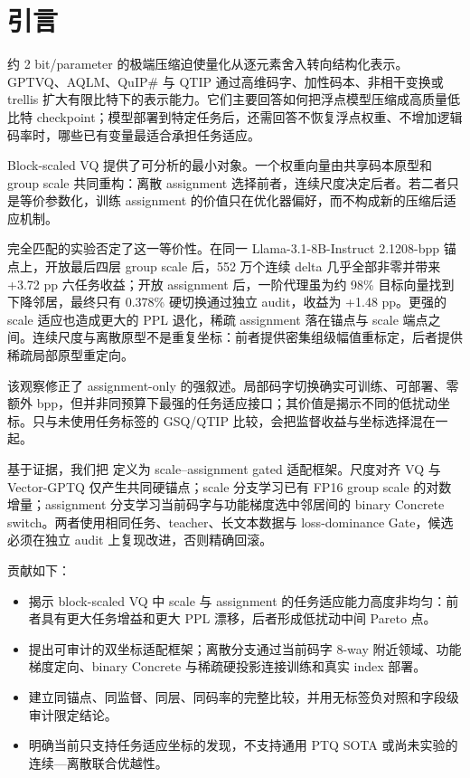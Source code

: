 \section{引言}

约 2 bit/parameter 的极端压缩迫使量化从逐元素舍入转向结构化表示。GPTVQ、AQLM、QuIP\# 与 QTIP 通过高维码字、加性码本、非相干变换或 trellis 扩大有限比特下的表示能力\cite{gptvq,aqlm,quipsharp,qtip}。它们主要回答如何把浮点模型压缩成高质量低比特 checkpoint；模型部署到特定任务后，还需回答不恢复浮点权重、不增加逻辑码率时，哪些已有变量最适合承担任务适应。

Block-scaled VQ 提供了可分析的最小对象。一个权重向量由共享码本原型和 group scale 共同重构：离散 assignment 选择前者，连续尺度决定后者。若二者只是等价参数化，训练 assignment 的价值只在优化器偏好，而不构成新的压缩后适应机制。

完全匹配的实验否定了这一等价性。在同一 Llama-3.1-8B-Instruct 2.1208-bpp 锚点上，开放最后四层 group scale 后，552 万个连续 delta 几乎全部非零并带来 +3.72 pp 六任务收益；开放 assignment 后，一阶代理虽为约 98\% 目标向量找到下降邻居，最终只有 0.378\% 硬切换通过独立 audit，收益为 +1.48 pp。更强的 scale 适应也造成更大的 PPL 退化，稀疏 assignment 落在锚点与 scale 端点之间。连续尺度与离散原型不是重复坐标：前者提供密集组级幅值重标定，后者提供稀疏局部原型重定向。

该观察修正了 assignment-only 的强叙述。局部码字切换确实可训练、可部署、零额外 bpp，但并非同预算下最强的任务适应接口；其价值是揭示不同的低扰动坐标。只与未使用任务标签的 GSQ/QTIP 比较，会把监督收益与坐标选择混在一起。

基于证据，我们把 \method 定义为 scale--assignment gated 适配框架。尺度对齐 VQ 与 Vector-GPTQ 仅产生共同硬锚点；scale 分支学习已有 FP16 group scale 的对数增量；assignment 分支学习当前码字与功能梯度选中邻居间的 binary Concrete switch。两者使用相同任务、teacher、长文本数据与 loss-dominance Gate，候选必须在独立 audit 上复现改进，否则精确回滚。

贡献如下：
\begin{itemize}
\item 揭示 block-scaled VQ 中 scale 与 assignment 的任务适应能力高度非均匀：前者具有更大任务增益和更大 PPL 漂移，后者形成低扰动中间 Pareto 点。
\item 提出可审计的双坐标适配框架；离散分支通过当前码字 8-way 附近领域、功能梯度定向、binary Concrete 与稀疏硬投影连接训练和真实 index 部署。
\item 建立同锚点、同监督、同层、同码率的完整比较，并用无标签负对照和字段级审计限定结论。
\item 明确当前只支持任务适应坐标的发现，不支持通用 PTQ SOTA 或尚未实验的连续—离散联合优越性。
\end{itemize}
